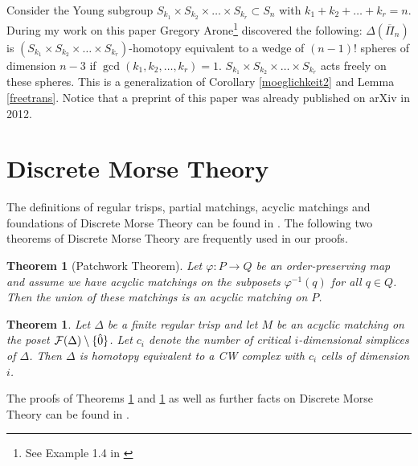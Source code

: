 \documentclass{elsarticle}
\newtheorem{thm}[df]{Theorem}
\begin{document}
Consider the Young subgroup $S_{k_1}\times S_{k_2}\times\dots\times S_{k_r}\subset S_n$ with $k_1+k_2+\dots+k_r=n$. During my work on this paper Gregory Arone\footnote{See Example 1.4 in \cite{arone}} discovered the following: $\Delta(\overline{\Pi}_n)$ is $(S_{k_1}\times S_{k_2}\times\dots\times S_{k_r})$-homotopy equivalent to a wedge of $(n-1)!$ spheres of dimension $n-3$ if $\gcd(k_1,k_2,\dots,k_r)=1$. $S_{k_1}\times S_{k_2}\times\dots\times S_{k_r}$ acts freely on these spheres. This is a generalization of Corollary \ref{moeglichkeit2} and Lemma \ref{freetrans}. Notice that a preprint of this paper was already published on arXiv in 2012.
\section{Discrete Morse Theory}
The definitions of regular trisps, partial matchings, acyclic matchings and foundations of Discrete Morse Theory can be found in \cite{forman,clmap,buch}. The following two theorems of Discrete Morse Theory are frequently used in our proofs.
\begin{thm}[Patchwork Theorem]
\label{patchwork}
Let $\varphi:P\longrightarrow Q$ be an order-preserving map and assume we have acyclic matchings on the subposets $\varphi^{-1}(q)$ for all $q\in Q$. Then the union of these matchings is an acyclic matching on $P$.
\end{thm}
\begin{thm}%
\label{morsemain}
Let $\Delta$ be a finite regular trisp and let $M$ be an acyclic matching on the poset ${\cal F}(\Delta)\setminus\{\hat{0}\}$. Let $c_i$ denote the number of critical $i$-dimensional simplices of $\Delta$. Then $\Delta$ is homotopy equivalent to a CW complex with $c_i$ cells of dimension $i$.
\end{thm}
The proofs of Theorems \ref{patchwork} and \ref{morsemain} as well as further facts on Discrete Morse Theory can be found in \cite[Chapter 11]{buch}.
\end{document}
